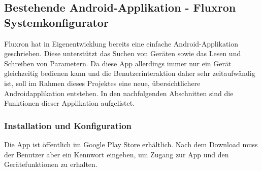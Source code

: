 \subsection{Bestehende Android-Applikation - Fluxron Systemkonfigurator }
\label{subsec:Bestehende Smartphone-Applikation}
Fluxron hat in Eigenentwicklung bereits eine einfache Android-Applikation geschrieben. Diese unterstützt das Suchen von Geräten sowie das Lesen und Schreiben von Parametern. Da diese App allerdings immer nur ein Gerät gleichzeitig bedienen kann und die Benutzerinteraktion daher sehr zeitaufwändig ist, soll im Rahmen dieses Projektes eine neue, übersichtlichere Androidapplikation entstehen. In den nachfolgenden Abschnitten sind die Funktionen dieser Applikation aufgelistet.

\subsubsection{Installation und Konfiguration}
\label{subsubsec:Installation und Konfiguration}
Die App ist öffentlich im Google Play Store erhältlich. Nach dem Download muss der Benutzer aber ein Kennwort eingeben, um Zugang zur App und den Gerätefunktionen zu erhalten.

